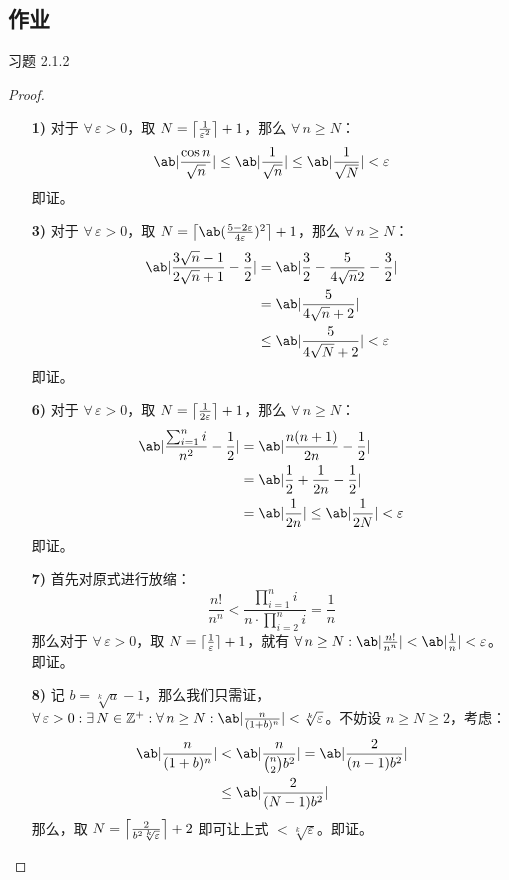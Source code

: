 \subsection{作业}

\begin{problem}
	习题 2.1.2
	\begin{proof}
		\begin{itemize}
			\item[\textbf{1)}] 对于 $\forall\,\varepsilon > 0$，取 $N = \ceil*{\frac{1}{\varepsilon^2}} + 1$，那么 $\forall\,n \ge N$：
			$$
			\ab|\frac{\cos n}{\sqrt n}| \le \ab|\frac{1}{\sqrt n}| \le \ab|\frac{1}{\sqrt N}| < \varepsilon
			$$
			即证。
			
			\item[\textbf{3)}] 对于 $\forall\,\varepsilon > 0$，取 $N = \ceil*{\ab(\frac{5 - 2\varepsilon}{4\varepsilon})^2} + 1$，那么 $\forall\,n \ge N$：
			$$
			\begin{aligned}
				\ab|\frac{3\sqrt n - 1}{2\sqrt n + 1} - \frac{3}{2}| & = \ab|\frac{3}{2} - \frac{5}{4\sqrt n 2} - \frac{3}{2}| \\
				& = \ab|\frac{5}{4\sqrt n + 2}| \\\
				& \le \ab|\frac{5}{4\sqrt N + 2}| < \varepsilon \\
			\end{aligned}
			$$
			即证。

			\item[\textbf{6)}] 对于 $\forall\,\varepsilon > 0$，取 $N = \ceil*{\frac{1}{2\varepsilon}} + 1$，那么 $\forall\,n \ge N$：
			$$
			\begin{aligned}
				\ab|\frac{\sum_{i=1}^n i}{n^2} - \frac{1}{2}| & = \ab|\frac{n(n+1)}{2n} - \frac{1}{2}| \\
				& = \ab|\frac{1}{2} + \frac{1}{2n} - \frac{1}{2}| \\
				& = \ab|\frac{1}{2n}| \le \ab|\frac{1}{2N}| < \varepsilon
			\end{aligned}
			$$
			即证。
			
			\item[\textbf{7)}] 首先对原式进行放缩：
			$$
			\frac{n!}{n^n} < \frac{\prod_{i=1}^n i}{n \cdot \prod_{i=2}^n i} = \frac{1}{n}
			$$
			那么对于 $\forall\,\varepsilon > 0$，取 $N = \ceil{\frac{1}{\varepsilon}} + 1$，就有 $\forall\,n \ge N: \ab|\frac{n!}{n^n}| < \ab|\frac{1}{n}| < \varepsilon$。即证。

			\item[\textbf{8)}] 记 $b = \sqrt[k]{a} - 1$，那么我们只需证，$\forall\,\varepsilon > 0: \exists\,N \in \mathbb{Z}^+: \forall\,n \ge N: \ab|\frac{n}{(1+b)^n}| < \sqrt[k]\varepsilon$。不妨设 $n \ge N \ge 2$，考虑：
			$$
			\begin{aligned}
				\ab|\frac{n}{(1+b)^n}| & < \ab|\frac{n}{\binom{n}{2} b^2}| = \ab|\frac{2}{(n-1) b^2}| \\
				& \le \ab|\frac{2}{(N-1) b^2}|
			\end{aligned}
			$$
			那么，取 $N = \ceil*{\frac{2}{b^2 \sqrt[k] \varepsilon}} + 2$ 即可让上式 $< \sqrt[k] \varepsilon$。即证。


\end{itemize}
\end{proof}
\end{problem}
